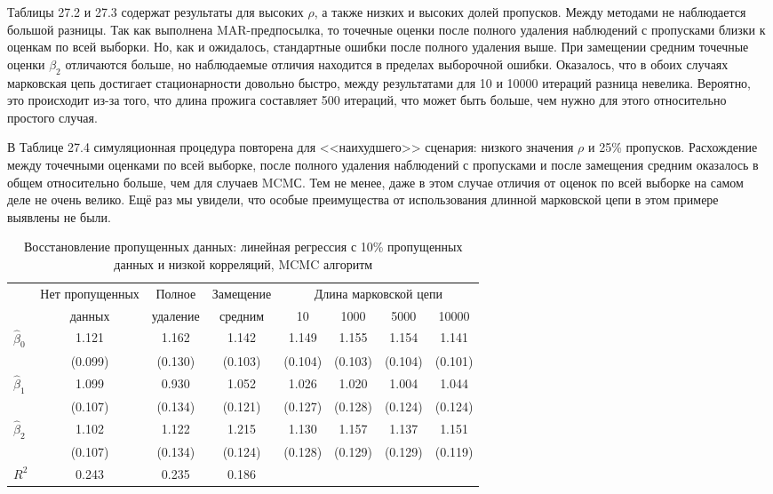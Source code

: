               
      
      




Таблицы 27.2 и 27.3 содержат результаты для высоких $\rho$, а также низких и высоких долей пропусков. Между методами не наблюдается большой разницы. Так как выполнена MAR-предпосылка, то точечные оценки после полного удаления наблюдений с пропусками близки к оценкам по всей выборки.  Но, как и ожидалось, стандартные ошибки после полного удаления выше. При замещении средним точечные оценки $\beta_2$ отличаются больше, но наблюдаемые отличия находится в пределах выборочной ошибки. Оказалось, что в обоих случаях марковская цепь достигает стационарности довольно быстро, между результатами для 10 и 10000 итераций разница невелика. Вероятно, это происходит из-за того, что длина прожига составляет 500 итераций, что может быть больше, чем нужно для этого относительно простого случая.

В Таблице 27.4 симуляционная процедура повторена для <<наихудшего>> сценария: низкого значения $\rho$ и 25\% пропусков. Расхождение между точечными оценками по всей выборке, после полного удаления наблюдений с пропусками и после замещения средним оказалось в общем относительно больше, чем для случаев MCMС. Тем не менее, даже в этом случае отличия от оценок по всей выборке на самом деле не очень велико. Ещё раз мы увидели, что особые преимущества от использования длинной марковской цепи в этом примере выявлены не были.



\begin{table}[h]
\begin{center}
\caption{\label{tab:27.4} Восстановление пропущенных данных: линейная регрессия с 10\% пропущенных данных и низкой корреляций, MCMC алгоритм}
\begin{tabular}[t]{lccccccc}
\hline
\hline
 & Нет пропущенных & Полное & Замещение & \multicolumn{4}{c}{Длина марковской цепи} \\
 & данных & удаление & средним  & 10 & 1000 & 5000 & 10000 \\
\hline
$\hat{\beta}_0$  &  1.121 & 1.162 & 1.142 & 1.149 & 1.155 & 1.154 & 1.141 \\
& (0.099) & (0.130) & (0.103) & (0.104) & (0.103) & (0.104) & (0.101) \\
$\hat{\beta}_1$  & 1.099 & 0.930 & 1.052 & 1.026 & 1.020 & 1.004 & 1.044  \\
& (0.107) & (0.134) & (0.121) & (0.127) & (0.128) & (0.124) & (0.124) \\
$\hat{\beta}_2$  &  1.102 & 1.122 & 1.215 & 1.130 & 1.157 & 1.137 & 1.151 \\
&  (0.107) & (0.134) & (0.124) & (0.128) & (0.129) & (0.129) & (0.119) \\
$R^2$ & 0.243 & 0.235 & 0.186 & & & & \\
\hline
\hline
\end{tabular}
\end{center}
\end{table}


